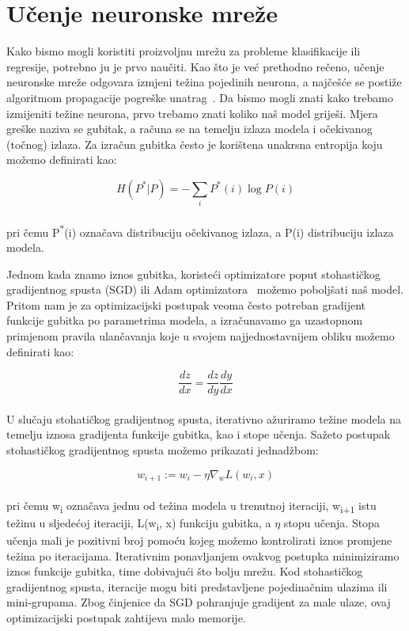 \documentclass[times, utf8, zavrsni, numeric]{fer}
\begin{document}
\section{Učenje neuronske mreže}
Kako bismo mogli koristiti proizvoljnu mrežu za probleme klasifikacije ili regresije, potrebno ju je prvo naučiti. 
Kao što je već prethodno rečeno, učenje neuronske mreže odgovara izmjeni težina pojedinih neurona, a najčešće se postiže algoritmom propagacije pogreške unatrag~\cite{Goodfellow-et-al-2016}.
Da bismo mogli znati kako trebamo izmijeniti težine neurona, prvo trebamo znati koliko naš model griješi. Mjera greške naziva se gubitak, a računa se na temelju izlaza modela i očekivanog (točnog) izlaza.
Za izračun gubitka često je korištena unakrsna entropija koju možemo definirati kao:

\begin{equation}
    H(P^{*}|P) = -\sum_{i}P^{*}(i) \log{P(i)}
    \label{eq:cross_entropy}
\end{equation}
\\
pri čemu P\textsuperscript{*}(i) označava distribuciju očekivanog izlaza, a P(i) distribuciju izlaza modela.

\pagebreak

Jednom kada znamo iznos gubitka, koristeći optimizatore poput stohastičkog gradijentnog spusta (SGD) ili Adam optimizatora~\cite{kingma2014adam} možemo poboljšati naš model. 
Pritom nam je za optimizacijski postupak veoma često potreban gradijent funkcije gubitka po parametrima modela, a izračunavamo ga uzastopnom primjenom pravila ulančavanja koje u svojem najjednostavnijem obliku možemo definirati kao:

\begin{equation}
    \frac{dz}{dx} = \frac{dz}{dy} \frac{dy}{dx}
    \label{eq:chain_rule}
\end{equation}
\\
U slučaju stohatičkog gradijentnog spusta, iterativno ažuriramo težine modela na temelju iznosa gradijenta funkcije gubitka, kao i stope učenja. Sažeto postupak stohastičkog gradijentnog spusta možemo prikazati jednadžbom:

\begin{equation}
    w_{i+1} := w_{i} - \eta \nabla_{w} L(w_{i}, x)
    \label{eq:sgd}
\end{equation}
\\
pri čemu w\textsubscript{i} označava jednu od težina modela u trenutnoj iteraciji, w\textsubscript{i+1} istu težinu u sljedećoj iteraciji, L(w\textsubscript{i}, x) funkciju gubitka, a $\eta$ stopu učenja. 
Stopa učenja mali je pozitivni broj pomoću kojeg možemo kontrolirati iznos promjene težina po iteracijama. Iterativnim ponavljanjem ovakvog postupka minimiziramo iznos funkcije gubitka, time dobivajući što bolju mrežu.
Kod stohastičkog gradijentnog spusta, iteracije mogu biti predstavljene pojedinačnim ulazima ili mini-grupama. Zbog činjenice da SGD pohranjuje gradijent za male ulaze, ovaj optimizacijski postupak zahtijeva malo memorije.
\end{document}
